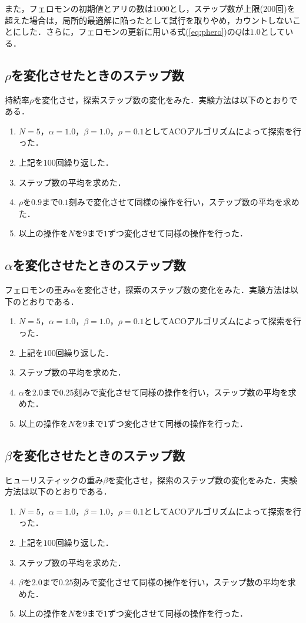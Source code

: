\documentclass{jarticle}
\begin{document}
また，フェロモンの初期値とアリの数は$1000$とし，ステップ数が上限($200$回)を超えた場合は，局所的最適解に陥ったとして試行を取りやめ，カウントしないことにした．さらに，フェロモンの更新に用いる式(\ref{eq:phero})の$Q$は$1.0$としている．

\subsection{$\rho$を変化させたときのステップ数}
持続率$\rho$を変化させ，探索ステップ数の変化をみた．実験方法は以下のとおりである．
\begin{enumerate}
	\item $N=5，\alpha=1.0，\beta=1.0，\rho=0.1$としてACOアルゴリズムによって探索を行った．
	\item 上記を$100$回繰り返した．
	\item ステップ数の平均を求めた．
	\item $\rho$を$0.9$まで$0.1$刻みで変化させて同様の操作を行い，ステップ数の平均を求めた．
	\item 以上の操作を$N$を$9$まで$1$ずつ変化させて同様の操作を行った．
\end{enumerate}

\subsection{$\alpha$を変化させたときのステップ数}
フェロモンの重み$\alpha$を変化させ，探索のステップ数の変化をみた．実験方法は以下のとおりである．
\begin{enumerate}
	\item $N=5，\alpha=1.0，\beta=1.0，\rho=0.1$としてACOアルゴリズムによって探索を行った．
	\item 上記を$100$回繰り返した．
	\item ステップ数の平均を求めた．
	\item $\alpha$を$2.0$まで$0.25$刻みで変化させて同様の操作を行い，ステップ数の平均を求めた．
	\item 以上の操作を$N$を$9$まで$1$ずつ変化させて同様の操作を行った．
\end{enumerate}

\subsection{$\beta$を変化させたときのステップ数}
ヒューリスティックの重み$\beta$を変化させ，探索のステップ数の変化をみた．実験方法は以下のとおりである．
\begin{enumerate}
	\item $N=5，\alpha=1.0，\beta=1.0，\rho=0.1$としてACOアルゴリズムによって探索を行った．
	\item 上記を$100$回繰り返した．
	\item ステップ数の平均を求めた．
	\item $\beta$を$2.0$まで$0.25$刻みで変化させて同様の操作を行い，ステップ数の平均を求めた．
	\item 以上の操作を$N$を$9$まで$1$ずつ変化させて同様の操作を行った．
\end{enumerate}
\end{document}
